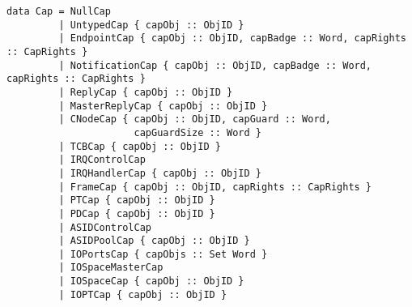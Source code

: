 \documentclass[a4paper,11pt]{article}
\begin{document}
{\small
\begin{verbatim}
data Cap = NullCap
         | UntypedCap { capObj :: ObjID } 
         | EndpointCap { capObj :: ObjID, capBadge :: Word, capRights :: CapRights }
         | NotificationCap { capObj :: ObjID, capBadge :: Word, capRights :: CapRights }
         | ReplyCap { capObj :: ObjID }
         | MasterReplyCap { capObj :: ObjID }
         | CNodeCap { capObj :: ObjID, capGuard :: Word, 
                      capGuardSize :: Word }
         | TCBCap { capObj :: ObjID }
         | IRQControlCap 
         | IRQHandlerCap { capObj :: ObjID }
         | FrameCap { capObj :: ObjID, capRights :: CapRights } 
         | PTCap { capObj :: ObjID } 
         | PDCap { capObj :: ObjID }
         | ASIDControlCap 
         | ASIDPoolCap { capObj :: ObjID }
         | IOPortsCap { capObjs :: Set Word }
         | IOSpaceMasterCap 
         | IOSpaceCap { capObj :: ObjID }
         | IOPTCap { capObj :: ObjID }
\end{verbatim}}
\end{document}
